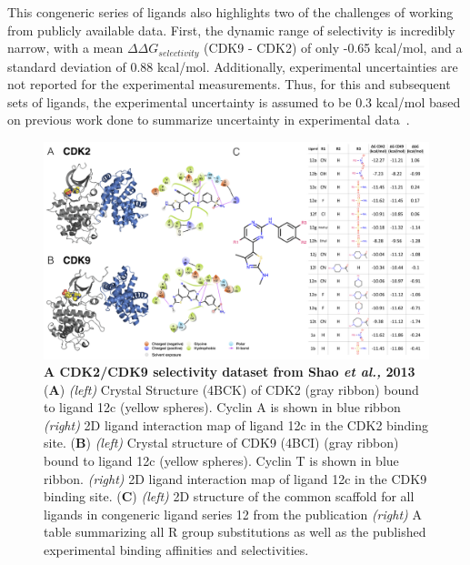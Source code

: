 \documentclass[phd,tocprelim]{cornell}
\begin{document}
This congeneric series of ligands also highlights two of the challenges of working from publicly available data. First, the dynamic range of selectivity is incredibly narrow, with a mean $\Delta \Delta G_{selectivity}$ (CDK9 - CDK2) of only -0.65 kcal/mol, and a standard deviation of 0.88 kcal/mol. Additionally, experimental uncertainties are not reported for the experimental measurements. Thus, for this and subsequent sets of ligands, the experimental uncertainty is assumed to be 0.3 kcal/mol based on previous work done to summarize uncertainty in experimental data~\citep{BROWN2009420,Hauser:2018vz}. 
\begin{landscape}
\begin{figure}[p]
\centering
	\includegraphics[width=1.0\linewidth]{figures/figure2.png}
	\caption[A CDK2/CDK9 selectivity dataset from Shao et \emph{al}., 2013]{{\bf A CDK2/CDK9 selectivity dataset from Shao \emph{et al.,} 2013}
({\bf A})  \emph{(left)} Crystal Structure (4BCK)\citep{Hole2013-sr} of CDK2 (gray ribbon)  bound to ligand 12c (yellow spheres). Cyclin A is shown in blue ribbon \emph{(right)} 2D ligand interaction map of ligand 12c in the CDK2 binding site. 
({\bf B}) \emph{(left)} Crystal structure of CDK9 (4BCI)\citep{Hole2013-sr} (gray ribbon) bound to ligand 12c (yellow spheres). Cyclin T is shown in blue ribbon. \emph{(right)} 2D ligand interaction map of ligand 12c in the CDK9 binding site.
({\bf C}) \emph{(left)} 2D structure of the common scaffold for all ligands in congeneric ligand series 12 from the publication \emph{(right)} A table summarizing all R group substitutions as well as the published experimental binding affinities and selectivities\citep{Shao2013-oe}. 
	}
	\label{fig:figure-2}
\end{figure}
\end{landscape}
\end{document}

